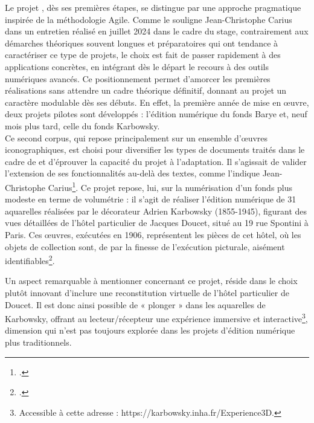 Le projet \pense, dès ses premières étapes, se distingue par une approche pragmatique inspirée de la méthodologie Agile. Comme le souligne Jean-Christophe Carius dans un entretien réalisé en juillet 2024 dans le cadre du stage, contrairement aux démarches théoriques souvent longues et préparatoires qui ont tendance à caractériser ce type de projets, le choix est fait de passer rapidement à des applications concrètes, en intégrant dès le départ le recours à des outils numériques avancés. Ce positionnement permet d’amorcer les premières réalisations sans attendre un cadre théorique définitif, donnant au projet un caractère modulable dès ses débuts. En effet, la première année de mise en œuvre, deux projets pilotes sont développés : l’édition numérique du fonds Barye et, neuf mois plus tard, celle du fonds Karbowsky. 
\newline
{}\\

Ce second corpus, qui repose principalement sur un ensemble d’œuvres iconographiques, est choisi pour diversifier les types de documents traités dans le cadre de \pense et d’éprouver la capacité du projet à l’adaptation. Il s’agissait de valider l'extension de ses fonctionnalités au-delà des textes, comme l’indique Jean-Christophe Carius\footcite{carius_ledition_2022}. 
Ce projet repose, lui, sur la numérisation d'un fonds plus modeste en terme de volumétrie : il s’agit de réaliser l’édition numérique de 31 aquarelles réalisées par le décorateur Adrien Karbowsky (1855-1945), figurant des vues détaillées de l'hôtel particulier de Jacques Doucet, situé au 19 rue Spontini à Paris. Ces œuvres, exécutées en 1906, représentent les pièces de cet hôtel, où les objets de collection sont, de par la finesse de l’exécution picturale, aisément identifiables\footcite{carius_ledition_2022}.

Un aspect remarquable à mentionner concernant ce projet, réside dans le choix plutôt innovant d’inclure une reconstitution virtuelle de l'hôtel particulier de Doucet. Il est donc ainsi possible de « plonger » dans les aquarelles de Karbowsky, offrant au lecteur/récepteur une expérience immersive et interactive\footnote{Accessible à cette adresse : https://karbowsky.inha.fr/Experience3D.}, dimension qui n’est pas toujours explorée dans les projets d’édition numérique plus traditionnels.
\newline
{}\\


